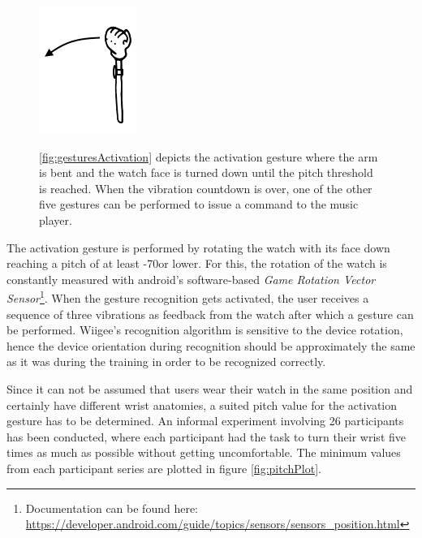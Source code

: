 \begin{figure}[Hbt]
	{\label{fig:gesturesPrevious}
	\includegraphics[width=.25\linewidth]{img/previous.png}} \quad
	\caption{\ref{fig:gesturesActivation} depicts the activation gesture where the arm is bent and the watch face is turned down until the pitch threshold is reached. When the vibration countdown is over, one of the other five gestures can be performed to issue a command to the music player.}
	\label{fig:gestures}
\end{figure}

The activation gesture is performed by rotating the watch with its face down reaching a pitch of at least -70\textdegree or lower. For this, the rotation of the watch is constantly measured with android's software-based \textit{Game Rotation Vector Sensor}\footnote{Documentation can be found here: \url{https://developer.android.com/guide/topics/sensors/sensors_position.html}}. When the gesture recognition gets activated, the user receives a sequence of three vibrations as feedback from the watch after which a gesture can be performed. Wiigee's recognition algorithm is sensitive to the device rotation, hence the device orientation during recognition should be approximately the same as it was during the training in order to be recognized correctly.

Since it can not be assumed that users wear their watch in the same position and certainly have different wrist anatomies, a suited pitch value for the activation gesture has to be determined. An informal experiment involving 26 participants has been conducted, where each participant had the task to turn their wrist five times as much as possible without getting uncomfortable. The minimum values from each participant series are plotted in figure \ref{fig:pitchPlot}.

